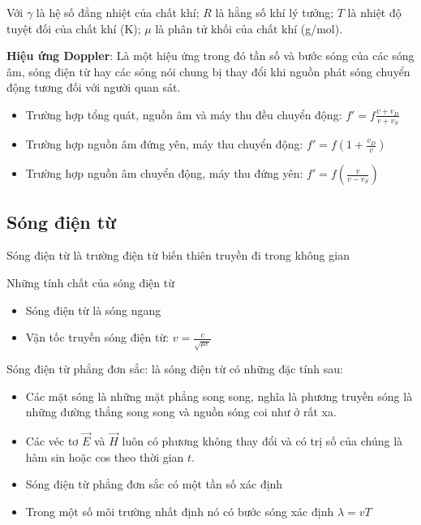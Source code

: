 \documentclass[12pt,a4paper]{article}
\begin{document}
Với $\gamma$ là hệ số đẳng nhiệt của chất khí; $R$ là hằng số khí lý tưởng; $T$ là nhiệt độ tuyệt đối của chất khí (K); $\mu$ là phân tử khối của chất khí (g/mol).

\textbf{Hiệu ứng Doppler}: Là một hiệu ứng trong đó tần số và bước sóng của các sóng âm, sóng
điện từ hay các sóng nói chung bị thay đổi khi nguồn phát sóng chuyển động tương đối với
người quan sát.

\begin{itemize}
    \item Trường hợp tổng quát, nguồn âm và máy thu đều chuyển động: $f' = f \frac{v + v_D}{v + v_S}$
    \item Trường hợp nguồn âm đứng yên, máy thu chuyển động: $f' = f \left(1 + \frac{v_D}{v}\right)$
    \item Trường hợp nguồn âm chuyển động, máy thu đứng yên: $f' = f \left(\frac{v}{v - v_S}\right)$
\end{itemize}

\subsection*{Sóng điện từ}

Sóng điện từ là trường điện từ biến thiên truyền đi trong không gian

Những tính chất của sóng điện từ

\begin{itemize}
    \item Sóng điện từ là sóng ngang
    \item Vận tốc truyền sóng điện từ: $v = \frac{c}{\sqrt{\mu \varepsilon}}$
\end{itemize}

Sóng điện từ phẳng đơn sắc: là sóng điện từ có những đặc tính sau:

\begin{itemize}
    \item Các mặt sóng là những mặt phẳng song song, nghĩa là phương truyền sóng là những
đường thẳng song song và nguồn sóng coi như ở rất xa.
    \item Các véc tơ $\vec{E}$ và $\vec{H}$ luôn có phương không thay đổi và có trị số của chúng là hàm sin hoặc
cos theo thời gian $t$.
    \item Sóng điện từ phẳng đơn sắc có một tần số xác định
    \item Trong một số môi trường nhất định nó có bước sóng xác định $\lambda = vT$
\end{itemize}
\end{document}
